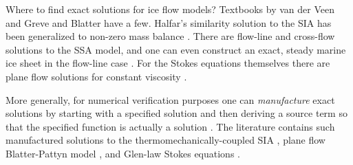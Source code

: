 \documentclass[letterpaper,final,12pt,reqno]{amsart}
\begin{document}
Where to find exact solutions for ice flow models?  Textbooks by van der Veen \cite{vanderVeen} and Greve and Blatter \cite{GreveBlatter2009} have a few.  Halfar's similarity solution to the SIA \cite{Halfar81,Halfar83} has been generalized to non-zero mass balance \cite{BLKCB}.  There are flow-line \cite{Bodvardsson,vanderVeen83} and cross-flow \cite{SchoofStream} solutions to the SSA model, and one can even construct an exact, steady marine ice sheet in the flow-line case \cite{Bueler2014exactmarine}.  For the Stokes equations themselves there are plane flow solutions for constant viscosity \cite{BaliseRaymond1985}.

More generally, for numerical verification purposes one can \emph{manufacture} exact solutions by starting with a specified solution and then deriving a source term so that the specified function is actually a solution \cite{Bueler2021,Roache}.  The literature contains such manufactured solutions to the thermomechanically-coupled SIA \cite{BBL}, plane flow Blatter-Pattyn model \cite{GlowinskiRappaz}, and Glen-law Stokes equations \cite{JouvetRappaz2011,Lengetal2012,SargentFastook2010}.

\footnotesize

\bigskip
\bigskip
%

\end{document}
